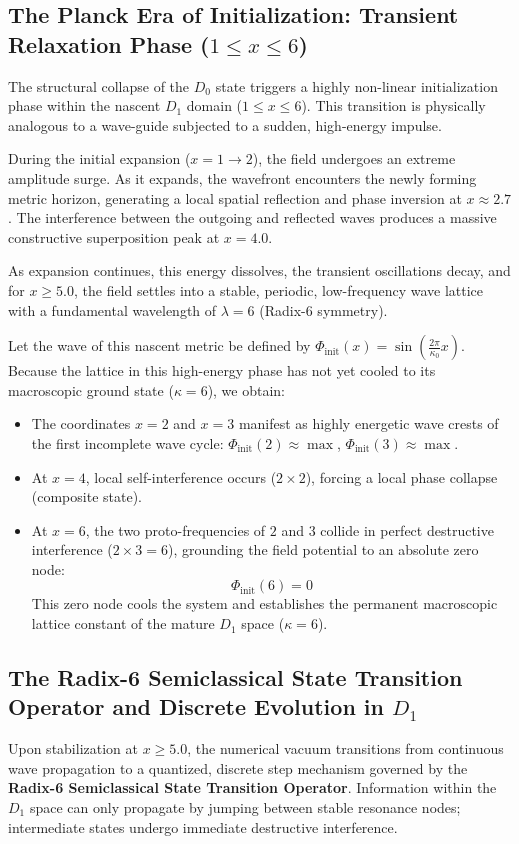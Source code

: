 \documentclass[11pt,a4paper]{article}
\theoremstyle{plain}
\theoremstyle{definition}
\theoremstyle{remark}
\begin{document}
\subsection{The Planck Era of Initialization: Transient Relaxation Phase ($1 \le x \le 6$)}
The structural collapse of the $D_0$ state triggers a highly non-linear initialization phase within the nascent $D_1$ domain ($1 \le x \le 6$). This transition is physically analogous to a wave-guide subjected to a sudden, high-energy impulse.

During the initial expansion ($x = 1 \to 2$), the field undergoes an extreme amplitude surge. As it expands, the wavefront encounters the newly forming metric horizon, generating a local spatial reflection and phase inversion at $x \approx 2.7$. The interference between the outgoing and reflected waves produces a massive constructive superposition peak at $x = 4.0$. 

As expansion continues, this energy dissolves, the transient oscillations decay, and for $x \ge 5.0$, the field settles into a stable, periodic, low-frequency wave lattice with a fundamental wavelength of $\lambda = 6$ (Radix-6 symmetry).

Let the wave of this nascent metric be defined by $\Phi_{\text{init}}(x) = \sin\left(\frac{2\pi}{\kappa_0} x\right)$. Because the lattice in this high-energy phase has not yet cooled to its macroscopic ground state ($\kappa = 6$), we obtain:
\begin{itemize}
    \item The coordinates $x=2$ and $x=3$ manifest as highly energetic wave crests of the first incomplete wave cycle: $\Phi_{\text{init}}(2) \approx \max$, $\Phi_{\text{init}}(3) \approx \max$.
    \item At $x = 4$, local self-interference occurs ($2 \times 2$), forcing a local phase collapse (composite state).
    \item At $x = 6$, the two proto-frequencies of $2$ and $3$ collide in perfect destructive interference ($2 \times 3 = 6$), grounding the field potential to an absolute zero node:
    \begin{equation}
    \Phi_{\text{init}}(6) = 0
    \end{equation}
    This zero node cools the system and establishes the permanent macroscopic lattice constant of the mature $D_1$ space ($\kappa = 6$).
\end{itemize}

\subsection{The Radix-6 Semiclassical State Transition Operator and Discrete Evolution in $D_1$}
Upon stabilization at $x \ge 5.0$, the numerical vacuum transitions from continuous wave propagation to a quantized, discrete step mechanism governed by the \textbf{Radix-6 Semiclassical State Transition Operator}. Information within the $D_1$ space can only propagate by jumping between stable resonance nodes; intermediate states undergo immediate destructive interference.
\end{document}
